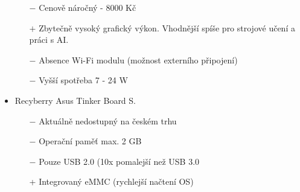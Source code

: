 \begin{itemize}
\begin{itemize}
            \item[$-$] Cenově náročný - 8000 Kč
            \item[$+$] Zbytečně vysoký grafický výkon. Vhodnější spíše pro strojové učení a práci s AI.
            \item[$-$] Absence Wi-Fi modulu (možnost externího připojení)
            \item[$-$] Vyšší spotřeba 7 - 24 W
        \end{itemize}
    \item Recyberry Asus Tinker Board S. 
        \begin{itemize}
            \item[$-$] Aktuálně nedostupný na českém trhu%
            \item[$-$] Operační paměť max. 2 GB
            \item[$-$] Pouze USB 2.0 (10x pomalejší než USB 3.0 %
            \item[+] Integrovaný eMMC (rychlejší načtení OS)
        \end{itemize}
\end{itemize}










%
%
%
%
